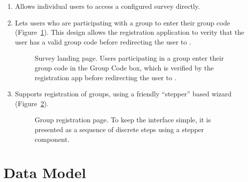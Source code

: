 \documentclass{article}
\begin{document}
\begin{enumerate}
\item
  Allows individual users to access a configured survey directly.
\item
  Lets users who are participating with a group to enter their
  group code (Figure~\ref{fig:survey-landing-page}).
  This design allows the registration application
  to verity that the user has a valid group code
  before redirecting the user to \qual.
  \begin{figure}
    \centering
    \caption{
      Survey landing page.
      Users participating in a group
      enter their group code
      in the \textsf{Group Code} box,
      which is verified by the registration app
      before redirecting the user to \qual.
    }
    \label{fig:survey-landing-page}
  \end{figure}
\item
  Supports registration of groups,
  using a friendly ``stepper'' based wizard
  (Figure~\ref{fig:group-registration}).
  \begin{figure}
    \centering
    \caption{
      Group registration page.
      To keep the interface simple,
      it is presented as a sequence of discrete steps
      using a \vue{} stepper component.
    }
    \label{fig:group-registration}
  \end{figure}
\end{enumerate}

\section{Data Model}
\label{sec:data-model-overview}
\end{document}
